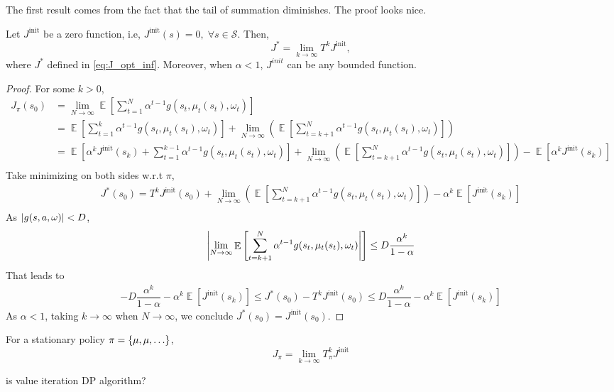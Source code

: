 \documentclass[11pt,a4paper]{article}
\begin{document}
The first result comes from the fact that the tail of summation diminishes. The proof looks nice.
\begin{theorem}
    \label{theorem:dp_convergence}
         Let $J^{\text{init}}$ be a zero function, i.e, $J^{\text{init}}(s) = 0, \; \forall s \in \mathcal{S}$. Then,
\[
J^{*} = \lim_{k \to \infty} T^{k} J^{\text{init}},
\] 
where $J^{*}$ defined in \eqref{eq:J_opt_inf}.
Moreover, when $\alpha<1$, $J^{init}$ can be any bounded function.
\end{theorem}
\begin{proof}
For some $k>0$,
   \begin{align*}
   J_\pi(s_0) 
   &= \lim_{N \to \infty} \mathop{\mathbb{E}} \left[ \sum^{N}_{t=1}   \alpha ^{t-1} g(s_t, \mu_t(s_t), \omega_t) \right] \\
   &= \mathop{\mathbb{E}} \left[ \sum^{k}_{t=1} \alpha ^{t-1} g(s_t, \mu_t(s_t), \omega_t) \right] + \lim_{N \to \infty} \left( \mathop{\mathbb{E}} \left[ \sum^{N}_{t=k+1} \alpha ^{t-1} g(s_t, \mu_t(s_t), \omega_t) \right]\right) \\
   &= \mathop{\mathbb{E}} \left[ \alpha ^{k}J^{\text{init}}(s_k) + \sum^{k-1}_{t=1} \alpha ^{t-1} g(s_t, \mu_t(s_t), \omega_t) \right] + \lim_{N \to \infty} \left( \mathop{\mathbb{E}} \left[ \sum^{N}_{t=k+1} \alpha ^{t-1} g(s_t, \mu_t(s_t), \omega_t) \right]\right)  - \mathop{\mathbb{E}}[\alpha^{k} J^{\text{init}}(s_k)]\\
   \end{align*} 
   Take minimizing on both sides w.r.t $\pi$,
   \begin{align*}
   J^{*}(s_0) = T^{k} J^{\text{init}}(s_0) + \lim_{N \to \infty} \left( \mathop{\mathbb{E}} \left[ \sum^{N}_{t=k+1} \alpha ^{t-1} g(s_t, \mu_t(s_t), \omega_t) \right]\right) - \alpha ^{k} \mathop{\mathbb{E}}[J^{\text{init}}(s_k)]\\
   \end{align*}
   As $\left\lvert g(s, a, \omega)\right\rvert < D$,
   \[
 \left\lvert  \lim_{N\to \infty} \mathop{\mathbb{E}} \left[\sum^{N}_{t=k+1} \alpha ^{t-1} g(s_t, \mu_t(s_t), \omega_t) \right\rvert\right]
       \leq D  \dfrac{\alpha^{k}}{1-\alpha}
   \] 
   That leads to
   \begin{align*}
   -D \dfrac{\alpha ^{k}}{1-\alpha} - \alpha ^{k} \mathop{\mathbb{E}}[J^{\text{init}}(s_k)]
\leq J^{*}(s_0) - T^{k} J^{\text{init}}(s_0) \leq D \dfrac{\alpha ^{k}}{1-\alpha} - \alpha ^{k} \mathop{\mathbb{E}}[J^{\text{init}}(s_k)]
   \end{align*}
   As $\alpha < 1$, taking $k \to \infty$ when $N \to \infty$, we conclude $J^{*}(s_0) = J^{\text{init}}(s_0)$.
\end{proof}
\begin{corollary}
   For a stationary policy $\pi = \left\{\mu, \mu, \ldots \right\}$,
   \[
   J_\pi = \lim_{k \to \infty} T_{\pi}^{k} J^{\text{init}}
   \] 
\end{corollary}
{\red is value iteration DP algorithm?}
\end{document}
